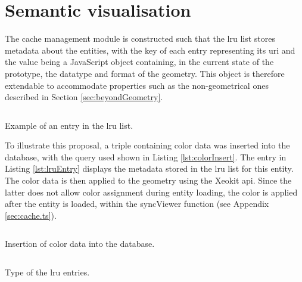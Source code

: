\section{Semantic visualisation}
The cache management module is constructed such that the \ac{lru} list stores metadata about the entities, with the key of each entry representing its \ac{uri} and the value being a JavaScript object containing, in the current state of the prototype, the datatype and format of the geometry. This object is therefore extendable to accommodate properties such as the non-geometrical ones described in Section \ref{sec:beyondGeometry}.

\begin{listing}[H]
    \inputminted{json}{dynamicQueries/colorize/entry.json}
    \caption[LRU entry]{Example of an entry in the \ac{lru} list.}
    \label{lst:lruEntry}
\end{listing}

To illustrate this proposal, a triple containing color data was inserted into the database, with the query used shown in Listing \ref{lst:colorInsert}. The entry in Listing \ref{lst:lruEntry} displays the metadata stored in the \ac{lru} list for this entity. The color data is then applied to the geometry using the Xeokit \ac{api}. Since the latter does not allow color assignment during entity loading, the color is applied after the entity is loaded, within the syncViewer function (see Appendix \ref{sec:cache.ts}).

\begin{listing}[H]
    \inputminted{sparql}{dynamicQueries/colorize/insert.rq}
    \caption[Insert color data]{Insertion of color data into the database.}
    \label{lst:colorInsert}
\end{listing}

\begin{listing}[H]
    \inputminted{ts}{dynamicQueries/colorize/type.ts}
    \caption[\acs{lru} entry type]{Type of the \ac{lru} entries.}
    \label{lst:lruType}
\end{listing}

